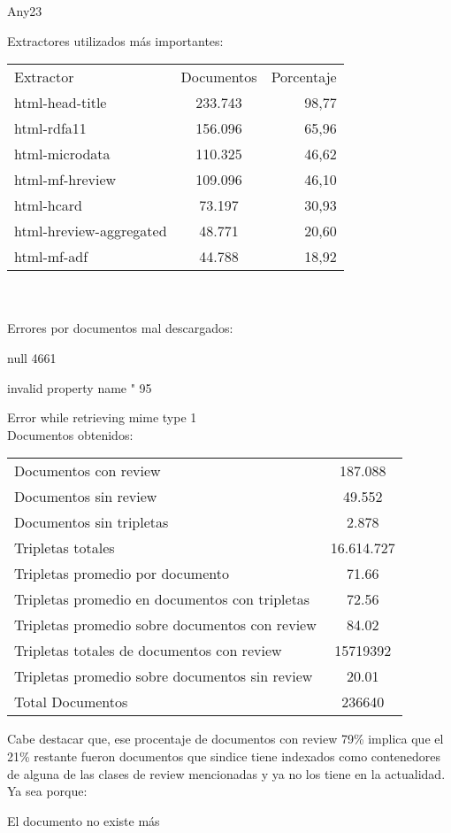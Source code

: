 Any23

Extractores utilizados más importantes:
\begin{tabular}{| l | c | r | }
Extractor & Documentos & Porcentaje \\
html-head-title & 233.743 & 98,77 \\    
html-rdfa11 & 156.096 & 65,96 \\
html-microdata & 110.325 & 46,62 \\    
html-mf-hreview & 109.096 & 46,10 \\
html-hcard & 73.197 & 30,93  \\
html-hreview-aggregated & 48.771 & 20,60 \\
html-mf-adf & 44.788 & 18,92 \\
 \end{tabular}
\\
\\
Errores por documentos mal descargados:

null 4661

invalid property name " 95

Error while retrieving mime type 1
\\ 
 
Documentos obtenidos:

\begin{tabular}{| l | c | }
Documentos con review & 187.088 \\
Documentos sin review & 49.552\\
Documentos sin tripletas & 2.878\\
Tripletas totales & 16.614.727\\
Tripletas promedio por documento & 71.66\\
Tripletas promedio en documentos con tripletas & 72.56\\
Tripletas promedio sobre documentos con review & 84.02\\
Tripletas totales de documentos con review & 15719392\\
Tripletas promedio sobre documentos sin review & 20.01\\
Total Documentos & 236640\\
\end{tabular}

Cabe destacar que, ese procentaje de documentos con review 79\% implica que el 21\% restante fueron documentos que sindice tiene indexados como contenedores de 
alguna de las clases de review mencionadas y ya no los tiene en la actualidad. Ya sea porque:

El documento no existe más

